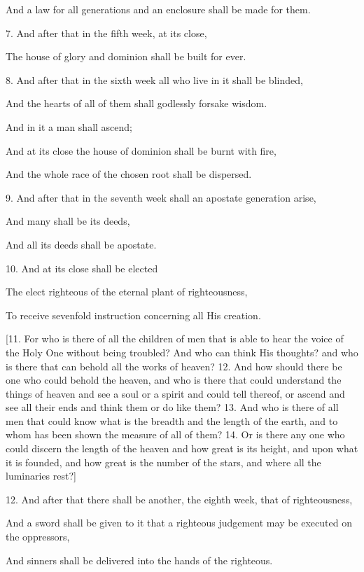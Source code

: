 And a law for all generations and an enclosure shall be made for them.

7. And after that in the fifth week, at its close,

The house of glory and dominion shall be built for ever.

8. And after that in the sixth week all who live in it shall be blinded,

And the hearts of all of them shall godlessly forsake wisdom.

And in it a man shall ascend;

And at its close the house of dominion shall be burnt with fire,

And the whole race of the chosen root shall be dispersed.

9. And after that in the seventh week shall an apostate generation arise,

And many shall be its deeds,

And all its deeds shall be apostate.

10. And at its close shall be elected

The elect righteous of the eternal plant of righteousness,

To receive sevenfold instruction concerning all His creation.

[11. For who is there of all the children of men that
is able to hear the voice of the Holy One without
being troubled? And who can think His thoughts?
and who is there that can behold all the works of
heaven? 12. And how should there be one who could
behold the heaven, and who is there that could
understand the things of heaven and see a soul or a
spirit and could tell thereof, or ascend and see all
their ends and think them or do like them? 13.
And who is there of all men that could know what is
the breadth and the length of the earth, and to whom
has been shown the measure of all of them? 14. Or
is there any one who could discern the length of the
heaven and how great is its height, and upon what it is
founded, and how great is the number of the stars,
and where all the luminaries rest?]


12. And after that there shall be another, the eighth week, that of righteousness,

And a sword shall be given to it that a righteous judgement may be executed on the oppressors,

And sinners shall be delivered into the hands of the righteous.


